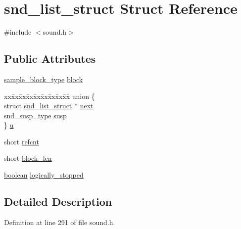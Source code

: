 \hypertarget{structsnd__list__struct}{}\section{snd\+\_\+list\+\_\+struct Struct Reference}
\label{structsnd__list__struct}


{\ttfamily \#include $<$sound.\+h$>$}

\subsection*{Public Attributes}
\begin{DoxyCompactItemize}
\item 
\hyperlink{sound_8h_a6becaef7eb98c0e45b13f72dadf07b23}{sample\+\_\+block\+\_\+type} \hyperlink{structsnd__list__struct_aaf6e754e36ceada326133f729fc4462c}{block}
\item 
\begin{tabbing}
xx\=xx\=xx\=xx\=xx\=xx\=xx\=xx\=xx\=\kill
union \{\\
\>struct \hyperlink{structsnd__list__struct}{snd\_list\_struct} $\ast$ \hyperlink{structsnd__list__struct_a3a9e571a923a7496eabe0d721e497fbf}{next}\\
\>\hyperlink{sound_8h_ab2d3b7883b72a75324f6636f10c7f903}{snd\_susp\_type} \hyperlink{structsnd__list__struct_a57f7d6b31a871ee6d94757b409f636ee}{susp}\\
\} \hyperlink{structsnd__list__struct_a7eb4e39c02b1fa81d1000b204f888777}{u}\\

\end{tabbing}\item 
short \hyperlink{structsnd__list__struct_a27044dc0ac840d508156da70b7b8eec5}{refcnt}
\item 
short \hyperlink{structsnd__list__struct_a809aedecf6147df4ec4b45404cfab414}{block\+\_\+len}
\item 
\hyperlink{cext_8h_a7670a4e8a07d9ebb00411948b0bbf86d}{boolean} \hyperlink{structsnd__list__struct_a09cdf89fd12d89166b27e4c3963420b3}{logically\+\_\+stopped}
\end{DoxyCompactItemize}


\subsection{Detailed Description}


Definition at line 291 of file sound.\+h.



